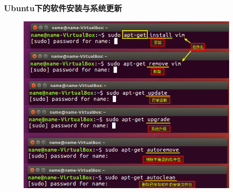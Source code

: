 \frame
{
	\frametitle{\textrm{Ubuntu}下的软件安装与系统更新}
\begin{figure}[h!]
\centering
\vspace{-11.5pt}
\includegraphics[height=0.74\textwidth]{Figures/Ubuntu-apt-get.png}
\label{Ubuntu-apt-get}
\end{figure}
}


